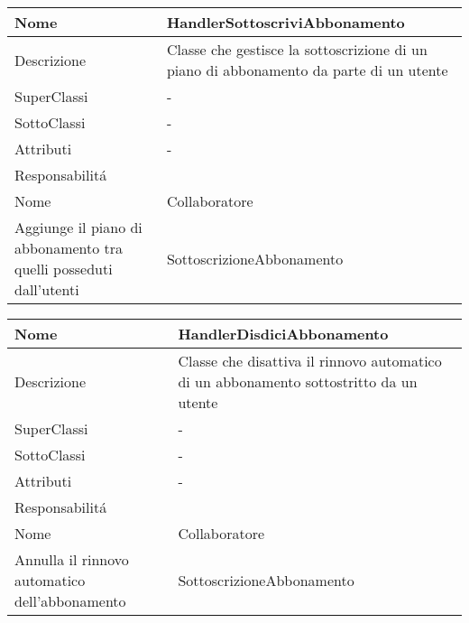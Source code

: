\begin{center}
    \begin{longtable}{ |p{3cm}|p{3cm}|p{3cm}|p{3cm}| }
        \hline
        Nome & \multicolumn{3}{|p{9cm}|}{HandlerSottoscriviAbbonamento} \\\hline
        Descrizione & \multicolumn{3}{|p{9cm}|}{Classe che gestisce la sottoscrizione di un piano di abbonamento da parte di un utente} \\\hline
        SuperClassi & \multicolumn{3}{|p{9cm}|}{-} \\\hline
        SottoClassi & \multicolumn{3}{|p{9cm}|}{-} \\\hline
        Attributi & \multicolumn{3}{|p{9cm}|}{-} \\\hline
        \multicolumn{4}{|p{12cm}|}{Responsabilit\'a} \\\hline
        \multicolumn{2}{|p{6cm}|}{Nome} & \multicolumn{2}{|p{6cm}|}{Collaboratore} \\\hline
        \multicolumn{2}{|p{6cm}|}{Aggiunge il piano di abbonamento tra quelli posseduti dall'utenti} & \multicolumn{2}{|p{6cm}|}{SottoscrizioneAbbonamento} \\\hline
    \end{longtable}
\end{center}

\begin{center}
    \begin{longtable}{ |p{3cm}|p{3cm}|p{3cm}|p{3cm}| }
        \hline
        Nome & \multicolumn{3}{|p{9cm}|}{HandlerDisdiciAbbonamento} \\\hline
        Descrizione & \multicolumn{3}{|p{9cm}|}{Classe che disattiva il rinnovo automatico di un abbonamento sottostritto da un utente} \\\hline
        SuperClassi & \multicolumn{3}{|p{9cm}|}{-} \\\hline
        SottoClassi & \multicolumn{3}{|p{9cm}|}{-} \\\hline
        Attributi & \multicolumn{3}{|p{9cm}|}{-} \\\hline
        \multicolumn{4}{|p{12cm}|}{Responsabilit\'a} \\\hline
        \multicolumn{2}{|p{6cm}|}{Nome} & \multicolumn{2}{|p{6cm}|}{Collaboratore} \\\hline
        \multicolumn{2}{|p{6cm}|}{Annulla il rinnovo automatico dell'abbonamento} & \multicolumn{2}{|p{6cm}|}{SottoscrizioneAbbonamento} \\\hline
    \end{longtable}
\end{center}


